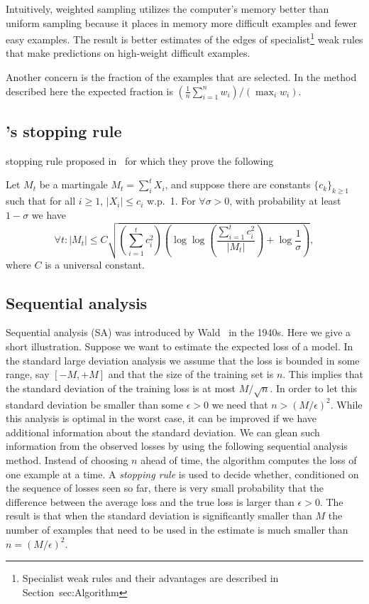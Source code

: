 Intuitively, weighted sampling utilizes the computer's memory better
than uniform sampling because it places in memory more difficult
examples and fewer easy examples. The result is better estimates of
the edges of specialist\footnote{Specialist weak rules and their
  advantages are described in Section~{sec:Algorithm}} weak rules that
make predictions on high-weight difficult examples.


Another concern is the fraction of the examples that are selected. In
the method described here the expected fraction is $(\frac{1}{n}
\sum_{i=1}^n w_i)/(\max_i w_i)$.

\subsection{\Sparrow's stopping rule} \label{sec:balsubramani}
 stopping rule proposed
in~\cite{balsubramani_sharp_2014} for which they prove the following

\begin{theorem} \label{thm:balsubramani}
  Let $M_t$ be a martingale $M_t = \sum_i^t X_i$,
  and suppose there are constants $\{c_k\}_{k \geq 1}$ such that
  for all $i \geq 1$, $|X_i| \leq c_i$ w.p.\ 1.
  For $\forall \sigma > 0$, with probability at least $1 - \sigma$ we have
  \[
  \forall t: |M_t| \leq C \sqrt{
    \left( \sum_{i=1}^t c_i^2 \right)
    \left( \log \log \left( \frac{ \sum_{i=1}^t c_i^2 }{ |M_t| }\right) +
    \log \frac{1}{\sigma} \right)
  },
  \]
  where $C$ is a universal constant.
\end{theorem}

\subsection{Sequential analysis}
Sequential analysis (SA) was introduced by
Wald~\cite{wald_sequential_1973} in the 1940s.  Here we give a short
illustration. Suppose we want to estimate the expected loss of a
model. In the standard large deviation analysis we assume that the
loss is bounded in some range, say $[-M,+M]$ and that the size of the
training set is $n$. This implies that the standard deviation of the
training loss is at most $M/\sqrt{n}$. In order to let this standard
deviation be smaller than some $\epsilon>0$ we need that
$n > (M/\epsilon)^2$. While this analysis is optimal in the worst case, it
can be improved if we have additional information about the standard
deviation. We can glean such information from the observed losses by
using the following sequential analysis method. Instead of choosing
$n$ ahead of time, the algorithm computes the loss of one example at a
time. A {\em stopping rule} is used to decide whether, conditioned on
the sequence of losses seen so far, there is very small probability
that the difference between the average loss and the true loss is
larger than $\epsilon>0$. The result is that when the standard
deviation is significantly smaller than $M$ the number of examples
that need to be used in the estimate is much smaller than
$n=(M/\epsilon)^2$.

